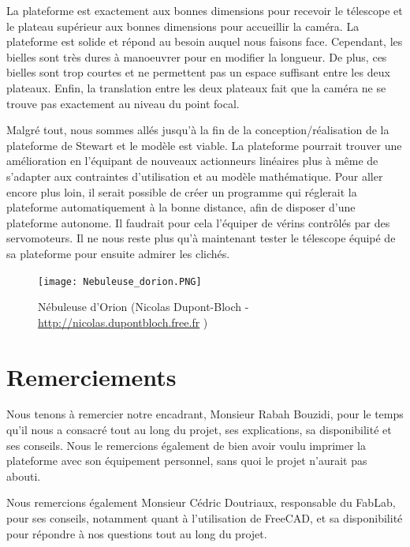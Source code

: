 \documentclass[a4paper,12pt]{article}
\begin{document}
\medskip

La plateforme est exactement aux bonnes dimensions pour recevoir le télescope et le
plateau supérieur aux bonnes dimensions pour accueillir la caméra. La plateforme est solide
et répond au besoin auquel nous faisons face. Cependant, les bielles sont
très dures à manoeuvrer pour en modifier la longueur. De plus, ces bielles sont trop courtes et ne permettent pas un espace suffisant entre les deux plateaux. Enfin, la translation entre les deux plateaux fait que la caméra ne se trouve pas exactement au niveau du point focal.

\medskip

Malgré tout, nous sommes allés jusqu'à la fin de la conception/réalisation de la plateforme de Stewart et le modèle est viable. La plateforme pourrait trouver une amélioration en l'équipant de nouveaux actionneurs linéaires plus à même de s'adapter aux contraintes d'utilisation et au modèle mathématique. Pour aller encore plus loin, il serait possible de créer un programme qui réglerait la plateforme automatiquement à la bonne distance, afin de disposer  d'une plateforme autonome. Il faudrait pour cela l'équiper de vérins contrôlés par des servomoteurs.
Il ne nous reste plus qu'à maintenant  tester le télescope équipé de sa plateforme pour ensuite admirer les clichés.


\begin{figure}[H]
  \centering
  \texttt{[image: Nebuleuse\_dorion.PNG]}
  \caption{Nébuleuse d'Orion (Nicolas Dupont-Bloch - \url{http://nicolas.dupontbloch.free.fr}
)}
\end{figure}

\newpage

\section{Remerciements}

Nous tenons à remercier notre encadrant, Monsieur Rabah Bouzidi, pour le temps qu'il nous a consacré tout au long du projet, ses explications, sa disponibilité et ses conseils. Nous le remercions également de bien avoir voulu imprimer la plateforme avec son équipement personnel, sans quoi le projet n'aurait pas abouti. 

\medskip

Nous remercions également Monsieur Cédric Doutriaux, responsable du FabLab, pour ses conseils, notamment quant à l'utilisation de FreeCAD, et sa disponibilité pour répondre à nos questions tout au long du projet.
\end{document}
